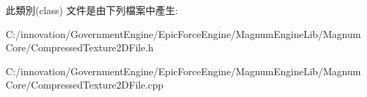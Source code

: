 此類別(class) 文件是由下列檔案中產生\+:\begin{DoxyCompactItemize}
\item 
C\+:/innovation/\+Government\+Engine/\+Epic\+Force\+Engine/\+Magnum\+Engine\+Lib/\+Magnum\+Core/Compressed\+Texture2\+D\+File.\+h\item 
C\+:/innovation/\+Government\+Engine/\+Epic\+Force\+Engine/\+Magnum\+Engine\+Lib/\+Magnum\+Core/Compressed\+Texture2\+D\+File.\+cpp\end{DoxyCompactItemize}
